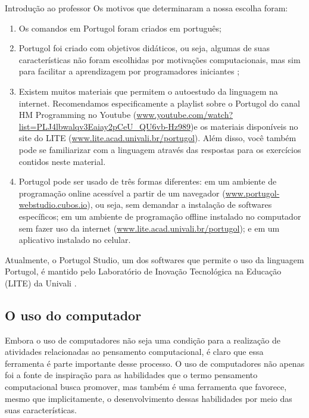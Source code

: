 \begin{apresentacao}{Introdução ao professor}
Os motivos que determinaram a nossa escolha foram:

\begin{enumerate}
\item Os comandos em Portugol foram criados em português;

\item Portugol foi criado com objetivos didáticos, ou seja, algumas de suas características não foram escolhidas por motivações computacionais, mas sim para facilitar a aprendizagem por programadores iniciantes \citep{noschang2014};

\item Existem muitos materiais que permitem o autoestudo da linguagem na internet. Recomendamos especificamente a playlist sobre o Portugol do canal HM Programming no Youtube (\url{www.youtube.com/watch?list=PLJ4lbwalqv3Eaiay2pCeU_QU6vb-Hz989})e os materiais disponíveis no site do LITE (\url{www.lite.acad.univali.br/portugol}). Além disso, você também pode se familiarizar com a linguagem através das respostas para os exercícios contidos neste material.

\item Portugol pode ser usado de três formas diferentes: em um ambiente de programação online acessível a partir de um navegador (\url{www.portugol-webstudio.cubos.io}), ou seja, sem demandar a instalação de softwares específicos; em um ambiente de programação offline instalado no computador sem fazer uso da internet (\url{www.lite.acad.univali.br/portugol}); e em um aplicativo instalado no celular.
\end{enumerate}

Atualmente, o Portugol Studio, um dos softwares que permite o uso da linguagem Portugol, é mantido pelo Laboratório de Inovação Tecnológica na Educação (LITE) da Univali \citep{esteves2019}.

\subsection{O uso do computador}

Embora o uso de computadores não seja uma condição para a realização de atividades relacionadas ao pensamento computacional, é claro que essa ferramenta é parte importante desse processo. O uso de computadores não apenas foi a fonte de inspiração para as habilidades que o termo pensamento computacional busca promover, mas também é uma ferramenta que favorece, mesmo que implicitamente, o desenvolvimento dessas habilidades por meio das suas características.


\end{apresentacao}
